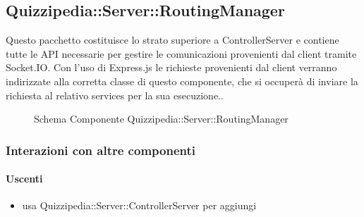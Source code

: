 \subsection{Quizzipedia::Server::RoutingManager}
Questo pacchetto costituisce lo strato superiore a ControllerServer e contiene tutte le API necessarie per gestire le comunicazioni provenienti dal client tramite Socket.IO. 
Con l'uso di Express.js le richieste provenienti dal client verranno indirizzate alla corretta classe di questo componente, che si occuperà di inviare la richiesta al relativo services per la sua esecuzione..
\begin{figure}[H]
\centering
\noindent{}
\caption[Schema Componente Quizzipedia::Server::RoutingManager]{Schema Componente Quizzipedia::Server::RoutingManager}
\end{figure}
\subsubsection{Interazioni con altre componenti}
\paragraph{Uscenti}
\begin{itemize}
\item usa Quizzipedia::Server::ControllerServer per aggiungi
\end{itemize}
